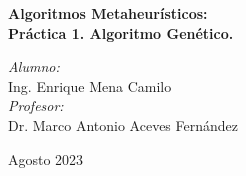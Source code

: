
\begin{titlepage}

\vspace*{10cm}
{\huge \bfseries \textcolor{RojoUAQ}{Algoritmos Metaheurísticos: \\ Práctica 1. Algoritmo Genético.}}

\vspace*{1cm}

\begin{center}
	\noindent
	\begin{minipage}{0.4\textwidth}
	\begin{flushleft} \large
	\end{flushleft}
	\end{minipage}	
	\begin{minipage}{0.5\textwidth}
	\begin{flushright} \large
	\emph{Alumno:} \\
	Ing. Enrique Mena Camilo \\[1.5cm]
	\emph{Profesor:} \\
	Dr. Marco Antonio Aceves Fernández
	\end{flushright}
	\end{minipage}
	\vfill
	{\large Agosto 2023}
\end{center}
\end{titlepage}
